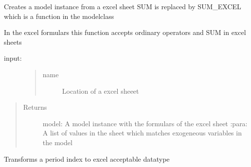 \documentclass[letterpaper,10pt,english]{sphinxmanual}
\begin{document}
\begin{fulllineitems}
\label{\detokenize{onboard/model_Excel:model_Excel.getexcelmodel}}
\pysigstartsignatures
{}
\pysigstopsignatures
\sphinxAtStartPar
Creates a model instance from a excel sheet
SUM is replaced by SUM\_EXCEL which is a function in the modelclass

\sphinxAtStartPar
In the excel formulars this function accepts ordinary operators and SUM in excel sheets
\begin{description}
\item[{input:}] \leavevmode\begin{quote}\begin{description}
\item[{name}] \leavevmode
\sphinxAtStartPar
Location of a excel sheeet

\end{description}\end{quote}

\end{description}
\begin{quote}\begin{description}
\item[{Returns}] \leavevmode
\sphinxAtStartPar
model: A model instance with the formulars of the excel sheet
:para: A list of values in the sheet which matches exogeneous variables in the model

\end{description}\end{quote}

\end{fulllineitems}


\begin{fulllineitems}
\label{\detokenize{onboard/model_Excel:model_Excel.indextrans}}
\pysigstartsignatures
{}
\pysigstopsignatures
\sphinxAtStartPar
Transforms a period index to excel acceptable datatype

\end{fulllineitems}

\end{document}
